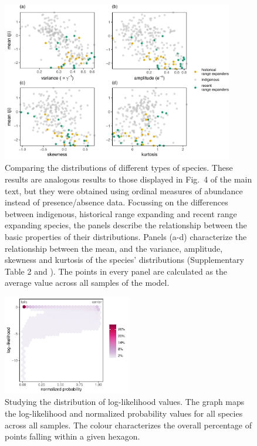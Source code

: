 \documentclass[11pt, a4paper]{article}
\begin{document}
\begin{figure}[ht]
  \centering
    \includegraphics[width=0.9\textwidth]{figures/categorical-figure3}
    	  \vspace{0.1cm}
	   \caption{Comparing the distributions of different types of species. These results are analogous results to those displayed in Fig.~4 of the main text, but they were obtained using ordinal measures of abundance instead of presence/absence data. Focussing on the differences between indigenous, historical range expanding and recent range expanding species, the panels describe the relationship between the basic properties of their distributions. Panels (a-d) characterize the relationship between the mean, and the variance, amplitude, skewness and kurtosis of the species' distributions (Supplementary Table 2 and \citealt{kermanSkewnessKurtosisBounds2013}). The points in every panel are calculated as the average value across all samples of the model. %
	   }
      \label{sfig:figure3-categorical}
\end{figure}

\clearpage

\begin{figure}[ht]
  \centering
    \includegraphics[width=0.5\textwidth]{figures/loglik-all-bin}
    	  \vspace{0.1cm}
	   \caption{Studying the distribution of log-likelihood values. The graph maps the log-likelihood and normalized probability values for all species across all samples. The colour characterizes the overall percentage of points falling within a given hexagon.}
      \label{sfig:loglik-all}
\end{figure}
\end{document}
